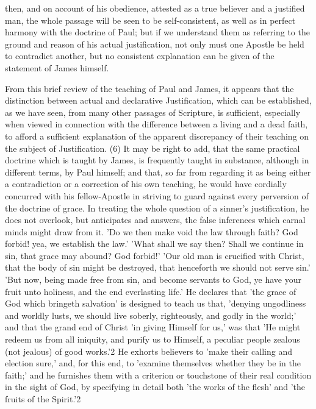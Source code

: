 \documentclass[
]{book}
\begin{document}
then, and on account of his obedience, attested as a true believer and a justified man, the whole passage will be seen to be self-consistent, as well as in perfect harmony with the doctrine of Paul; but if we understand them as referring to the ground and reason of his actual justification, not only must one Apostle be held to contradict another, but no consistent explanation can be given of the statement of James himself.

From this brief review of the teaching of Paul and James, it appears that the distinction between actual and declarative Justification, which can be established, as we have seen, from many other passages of Scripture, is sufficient, especially when viewed in connection with the difference between a living and a dead faith, to afford a sufficient explanation of the apparent discrepancy of their teaching on the subject of Justification. (6) It may be right to add, that the same practical doctrine which is taught by James, is frequently taught in substance, although in different terms, by Paul himself; and that, so far from regarding it as being either a contradiction or a correction of his own teaching, he would have cordially concurred with his fellow-Apostle in striving to guard against every perversion of the doctrine of grace. In treating the whole question of a sinner's justification, he does not overlook, but anticipates and answers, the false inferences which carnal minds might draw from it. 'Do we then make void the law through faith? God forbid! yea, we establish the law.' 'What shall we say then? Shall we continue in sin, that grace may abound? God forbid!' 'Our old man is crucified with Christ, that the body of sin might be destroyed, that henceforth we should not serve sin.' 'But now, being made free from sin, and become servants to God, ye have your fruit unto holiness, and the end everlasting life.' He declares that 'the grace of God which bringeth salvation' is designed to teach us that, 'denying ungodliness and worldly lusts, we should live soberly, righteously, and godly in the world;' and that the grand end of Christ 'in giving Himself for us,' was that 'He might redeem us from all iniquity, and purify us to Himself, a peculiar people zealous (not jealous) of good works.'2 He exhorts believers to 'make their calling and election sure,' and, for this end, to 'examine themselves whether they be in the faith;' and he furnishes them with a criterion or touchstone of their real condition in the sight of God, by specifying in detail both 'the works of the flesh' and 'the fruits of the Spirit.'2
\end{document}
